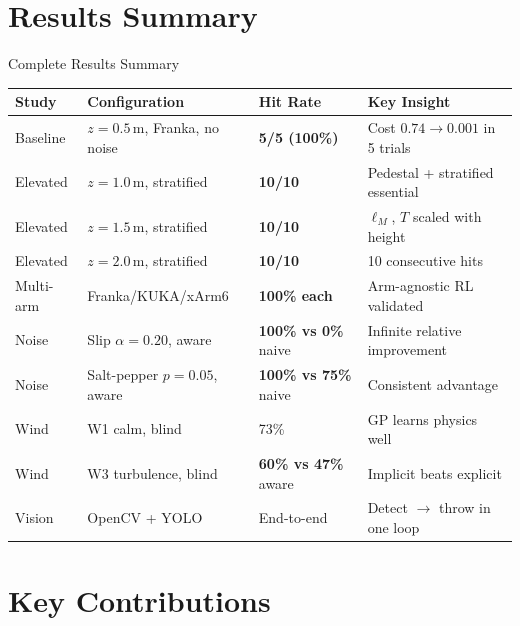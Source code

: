\documentclass{if-beamer}
\begin{document}
\section{Results Summary}

\begin{frame}{Complete Results Summary}
    \begin{center}
    \scriptsize
    \begin{tabular}{lllp{3.8cm}}
        \toprule
        \textbf{Study} & \textbf{Configuration} & \textbf{Hit Rate} & \textbf{Key Insight} \\
        \midrule
        Baseline        & $z=0.5$\,m, Franka, no noise     & \textbf{5/5 (100\%)}      & Cost $0.74\to0.001$ in 5 trials \\
        Elevated        & $z=1.0$\,m, stratified           & \textbf{10/10}            & Pedestal + stratified essential \\
        Elevated        & $z=1.5$\,m, stratified           & \textbf{10/10}            & $\ell_M$, $T$ scaled with height \\
        Elevated        & $z=2.0$\,m, stratified           & \textbf{10/10}            & 10 consecutive hits \\
        Multi-arm       & Franka/KUKA/xArm6               & \textbf{100\% each}       & Arm-agnostic RL validated \\
        Noise           & Slip $\alpha=0.20$, aware        & \textbf{100\% vs 0\%} naive & Infinite relative improvement \\
        Noise           & Salt-pepper $p=0.05$, aware      & \textbf{100\% vs 75\%} naive & Consistent advantage \\
        Wind            & W1 calm, blind                   & 73\%                      & GP learns physics well \\
        Wind            & W3 turbulence, blind             & \textbf{60\% vs 47\%} aware & Implicit beats explicit \\
        Vision          & OpenCV + YOLO                    & End-to-end                & Detect $\rightarrow$ throw in one loop \\
        \bottomrule
    \end{tabular}
    \end{center}
\end{frame}

\section{Key Contributions}
\end{document}
